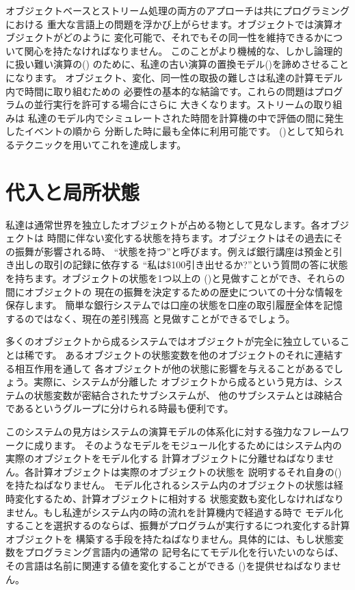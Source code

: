 オブジェクトベースとストリーム処理の両方のアプローチは共にプログラミングにおける
重大な言語上の問題を浮かび上がらせます。オブジェクトでは演算オブジェクトがどのように
変化可能で、それでもその同一性を維持できるかについて関心を持たなければなりません。
このことがより機械的な、しかし論理的に扱い難い演算の()
のために、私達の古い演算の置換モデル()を諦めさせることになります。
オブジェクト、変化、同一性の取扱の難しさは私達の計算モデル内で時間に取り組むための
必要性の基本的な結論です。これらの問題はプログラムの並行実行を許可する場合にさらに
大きくなります。ストリームの取り組みは
私達のモデル内でシミュレートされた時間を計算機の中で評価の間に発生したイベントの順から
分断した時に最も全体に利用可能です。
()として知られるテクニックを用いてこれを達成します。



\section{代入と局所状態}
\label{Section 3.1}



私達は通常世界を独立したオブジェクトが占める物として見なします。各オブジェクトは
時間に伴ない変化する状態を持ちます。オブジェクトはその過去にその振舞が影響される時、
``状態を持つ''と呼びます。例えば銀行講座は預金と引き出しの取引の記録に依存する
``私は\$100引き出せるか?''という質問の答に状態を持ちます。オブジェクトの状態を1つ以上の
()と見做すことができ、それらの間にオブジェクトの
現在の振舞を決定するための歴史についての十分な情報を保存します。
簡単な銀行システムでは口座の状態を口座の取引履歴全体を記憶するのではなく、現在の差引残高
と見做すことができるでしょう。



多くのオブジェクトから成るシステムではオブジェクトが完全に独立していることは稀です。
あるオブジェクトの状態変数を他のオブジェクトのそれに連結する相互作用を通して
各オブジェクトが他の状態に影響を与えることがあるでしょう。実際に、システムが分離した
オブジェクトから成るという見方は、システムの状態変数が密結合されたサブシステムが、
他のサブシステムとは疎結合であるというグループに分けられる時最も便利です。



このシステムの見方はシステムの演算モデルの体系化に対する強力なフレームワークに成ります。
そのようなモデルをモジュール化するためにはシステム内の実際のオブジェクトをモデル化する
計算オブジェクトに分離せねばなりません。各計算オブジェクトは実際のオブジェクトの状態を
説明するそれ自身の()を持たねばなりません。
モデル化されるシステム内のオブジェクトの状態は経時変化するため、計算オブジェクトに相対する
状態変数も変化しなければなりません。もし私達がシステム内の時の流れを計算機内で経過する時で
モデル化することを選択するのならば、振舞がプログラムが実行するにつれ変化する計算オブジェクトを
構築する手段を持たねばなりません。具体的には、もし状態変数をプログラミング言語内の通常の
記号名にてモデル化を行いたいのならば、その言語は名前に関連する値を変化することができる
()を提供せねばなりません。



